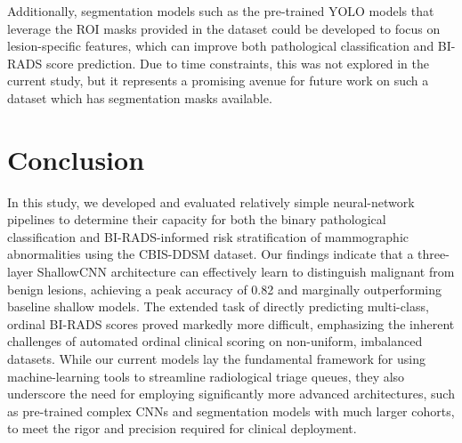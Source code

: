 \documentclass[12pt]{article}
\begin{document}
\medskip \noindent
Additionally, segmentation models such as the pre-trained YOLO models \cite{ref:yolo} that leverage the ROI masks provided in the dataset could be developed to focus on lesion-specific features, which can improve both pathological classification and BI-RADS score prediction. Due to time constraints, this was not explored in the current study, but it represents a promising avenue for future work on such a dataset which has segmentation masks available.


\section{Conclusion}

In this study, we developed and evaluated relatively simple neural-network pipelines to determine their capacity for both the binary pathological classification and BI-RADS-informed risk stratification of mammographic abnormalities using the CBIS-DDSM dataset. Our findings indicate that a three-layer ShallowCNN architecture can effectively learn to distinguish malignant from benign lesions, achieving a peak accuracy of 0.82 and marginally outperforming baseline shallow models. The extended task of directly predicting multi-class, ordinal BI-RADS scores proved markedly more difficult, emphasizing the inherent challenges of automated ordinal clinical scoring on non-uniform, imbalanced datasets. While our current models lay the fundamental framework for using machine-learning tools to streamline radiological triage queues, they also underscore the need for employing significantly more advanced architectures, such as pre-trained complex CNNs and segmentation models with much larger cohorts, to meet the rigor and precision required for clinical deployment.
\end{document}

